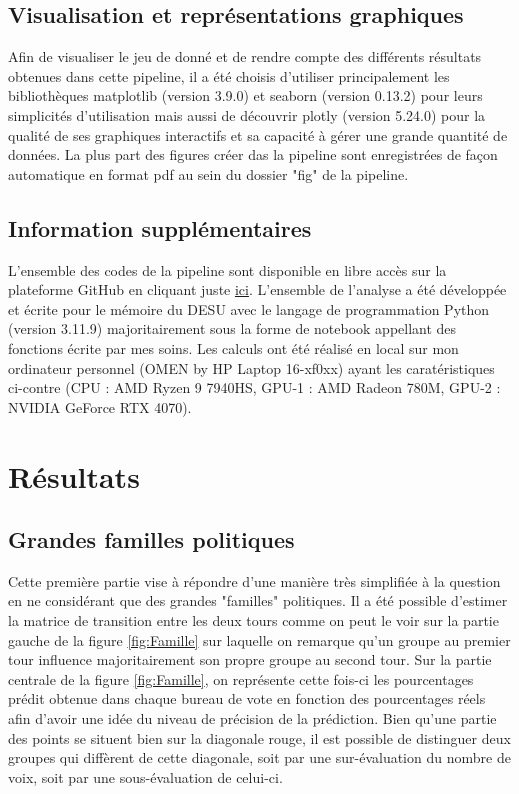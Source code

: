 \documentclass[11pt]{article}
\begin{document}
        \subsection*{Visualisation et représentations graphiques}
            Afin de visualiser le jeu de donné et de rendre compte des différents résultats obtenues dans cette pipeline, il a été choisis d'utiliser principalement les bibliothèques matplotlib (version 3.9.0) et seaborn (version 0.13.2) pour leurs simplicités d'utilisation mais aussi de découvrir plotly (version 5.24.0) pour la qualité de ses graphiques interactifs et sa capacité à gérer une grande quantité de données. La plus part des figures créer das la pipeline sont enregistrées de façon automatique en format pdf au sein du dossier "fig" de la pipeline.
            
        \subsection*{Information supplémentaires}
            L'ensemble des codes de la pipeline sont disponible en libre accès sur la plateforme GitHub en cliquant juste \href{https://github.com/alexandre-laine/Pipeline_Elections_Legislatives}{ici}. L'ensemble de l'analyse a été développée et écrite pour le mémoire du DESU avec le langage de programmation Python (version 3.11.9) majoritairement sous la forme de notebook appellant des fonctions écrite par mes soins. Les calculs ont été réalisé en local sur mon ordinateur personnel (OMEN by HP Laptop 16-xf0xx) ayant les caratéristiques ci-contre (CPU : AMD Ryzen 9 7940HS, GPU-1 : AMD Radeon 780M, GPU-2 : NVIDIA GeForce RTX 4070).

    \newpage
    \section{Résultats}
        
        \subsection*{Grandes familles politiques}
            
            Cette première partie vise à répondre d'une manière très simplifiée à la question en ne considérant que des grandes "familles" politiques. Il a été possible d'estimer la matrice de transition entre les deux tours comme on peut le voir sur la partie gauche de la figure \ref{fig:Famille} sur laquelle on remarque qu'un groupe au premier tour influence majoritairement son propre groupe au second tour. Sur la partie centrale de la figure \ref{fig:Famille}, on représente cette fois-ci les pourcentages prédit obtenue dans chaque bureau de vote en fonction des pourcentages réels afin d'avoir une idée du niveau de précision de la prédiction. Bien qu'une partie des points se situent bien sur la diagonale rouge, il est possible de distinguer deux groupes qui diffèrent de cette diagonale, soit par une sur-évaluation du nombre de voix, soit par une sous-évaluation de celui-ci.
            
\end{document}
